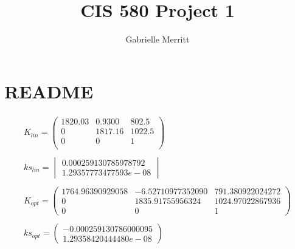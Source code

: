 \documentclass[english, twocolumn]{article}
\title{CIS 580 Project 1}
\author{Gabrielle Merritt}
\begin{document}
\maketitle
\section{README}
\begin{align*}
K_{lin} = \begin{pmatrix}
1820.03 & 0.9300 & 802.5 \\ 
0 &1817.16 & 1022.5 \\ 
0&0&1\\
\end{pmatrix}  \\ 
\\
ks_{lin} = \begin{vmatrix} 0.000259130785978792 \\ 1.29357773477593e-08
\end{vmatrix} \\ 
\\ 
K_{opt} =\begin{pmatrix}
1764.96390929058 	&-6.52710977352090	&791.380922024272\\
0	&1835.91755956324 &1024.97022867936 \\
0	&0&	1
\end{pmatrix} \\
\\
ks_{opt} = \begin{pmatrix}
 -0.000259130786000095\\ 
 1.29358420444480e-08
\end{pmatrix}\\
\end{align*} 
\end{document}
